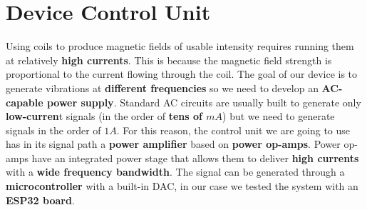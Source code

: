 \section{Device Control Unit}
Using coils to produce magnetic fields of usable intensity requires running them at relatively \textbf{high currents}.
This is because the magnetic field strength is proportional to the current flowing through the coil.
The goal of our device is to generate vibrations at \textbf{different frequencies} so we need to develop an \textbf{AC-capable power supply}.
Standard AC circuits are usually built to generate only \textbf{low-curren}t signals (in the order of \textbf{tens of $mA$}) but we need to generate signals in the order of \textbf{$1A$}.
For this reason, the control unit we are going to use has in its signal path a \textbf{power amplifier} based on \textbf{power op-amps}. Power op-amps have an integrated power stage that allows them to deliver \textbf{high currents} with a \textbf{wide frequency bandwidth}.
The signal can be generated through a \textbf{microcontroller} with a built-in DAC, in our case we tested the system with an \textbf{ESP32 board}.